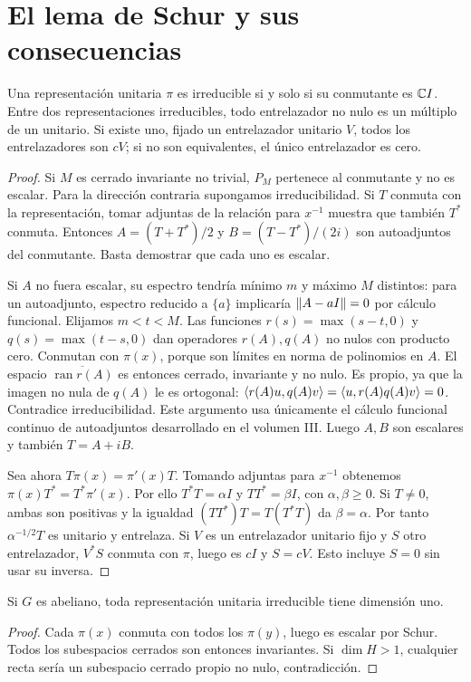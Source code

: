 \section{El lema de Schur y sus consecuencias}
\begin{teorema}\label{v4:schur}
Una representación unitaria $\pi$ es irreducible si y solo si su conmutante es $\mathbb C I$. Entre dos representaciones irreducibles, todo entrelazador no nulo es un múltiplo de un unitario. Si existe uno, fijado un entrelazador unitario $V$, todos los entrelazadores son $cV$; si no son equivalentes, el único entrelazador es cero.
\end{teorema}
\begin{proof}
Si $M$ es cerrado invariante no trivial, $P_M$ pertenece al conmutante y no es escalar. Para la dirección contraria supongamos irreducibilidad. Si $T$ conmuta con la representación, tomar adjuntas de la relación para $x^{-1}$ muestra que también $T^*$ conmuta. Entonces $A=(T+T^*)/2$ y $B=(T-T^*)/(2i)$ son autoadjuntos del conmutante. Basta demostrar que cada uno es escalar.

Si $A$ no fuera escalar, su espectro tendría mínimo $m$ y máximo $M$ distintos: para un autoadjunto, espectro reducido a $\{a\}$ implicaría $\left\lVert A-aI\right\rVert=0$ por cálculo funcional. Elijamos $m<t<M$. Las funciones $r(s)=\max(s-t,0)$ y $q(s)=\max(t-s,0)$ dan operadores $r(A),q(A)$ no nulos con producto cero. Conmutan con $\pi(x)$, porque son límites en norma de polinomios en $A$. El espacio $\overline{\operatorname{ran}r(A)}$ es entonces cerrado, invariante y no nulo. Es propio, ya que la imagen no nula de $q(A)$ le es ortogonal: $\left\langle r(A)u,q(A)v\right\rangle=\left\langle u,r(A)q(A)v\right\rangle=0$. Contradice irreducibilidad. Este argumento usa únicamente el cálculo funcional continuo de autoadjuntos desarrollado en el volumen III. Luego $A,B$ son escalares y también $T=A+iB$.

Sea ahora $T\pi(x)=\pi'(x)T$. Tomando adjuntas para $x^{-1}$ obtenemos $\pi(x)T^*=T^*\pi'(x)$. Por ello $T^*T=\alpha I$ y $TT^*=\beta I$, con $\alpha,\beta\geq0$. Si $T\ne0$, ambas son positivas y la igualdad $(TT^*)T=T(T^*T)$ da $\beta=\alpha$. Por tanto $\alpha^{-1/2}T$ es unitario y entrelaza. Si $V$ es un entrelazador unitario fijo y $S$ otro entrelazador, $V^*S$ conmuta con $\pi$, luego es $cI$ y $S=cV$. Esto incluye $S=0$ sin usar su inversa.
\end{proof}
\begin{corolario}
Si $G$ es abeliano, toda representación unitaria irreducible tiene dimensión uno.
\end{corolario}
\begin{proof}
Cada $\pi(x)$ conmuta con todos los $\pi(y)$, luego es escalar por Schur. Todos los subespacios cerrados son entonces invariantes. Si $\dim H>1$, cualquier recta sería un subespacio cerrado propio no nulo, contradicción.
\end{proof}

